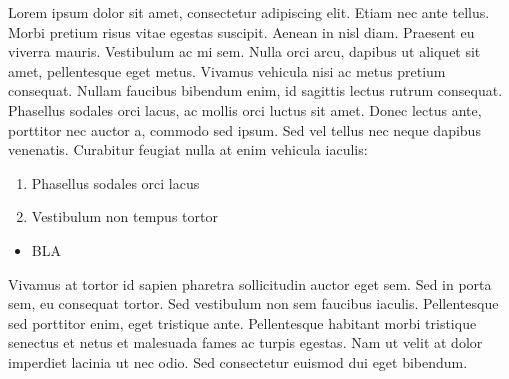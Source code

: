 \documentclass[a4paper,12pt]{texMemo}
\begin{document}
\maketitle %
Lorem ipsum dolor sit amet, consectetur adipiscing elit. Etiam nec ante tellus. Morbi pretium risus vitae egestas suscipit. Aenean in nisl diam. Praesent eu viverra mauris. Vestibulum ac mi sem. Nulla orci arcu, dapibus ut aliquet sit amet, pellentesque eget metus. Vivamus vehicula nisi ac metus pretium consequat. Nullam faucibus bibendum enim, id sagittis lectus rutrum consequat. Phasellus sodales orci lacus, ac mollis orci luctus sit amet. Donec lectus ante, porttitor nec auctor a, commodo sed ipsum. Sed vel tellus nec neque dapibus venenatis. Curabitur feugiat nulla at enim vehicula iaculis:

\begin{enumerate}
\item Phasellus sodales orci lacus
\item Vestibulum non tempus tortor
\end{enumerate}

\begin{itemize}
\item BLA

\end{itemize}


Vivamus at tortor id sapien pharetra sollicitudin auctor eget sem. Sed in porta sem, eu consequat tortor. Sed vestibulum non sem faucibus iaculis. Pellentesque sed porttitor enim, eget tristique ante. Pellentesque habitant morbi tristique senectus et netus et malesuada fames ac turpis egestas. Nam ut velit at dolor imperdiet lacinia ut nec odio. Sed consectetur euismod dui eget bibendum.
\end{document}
